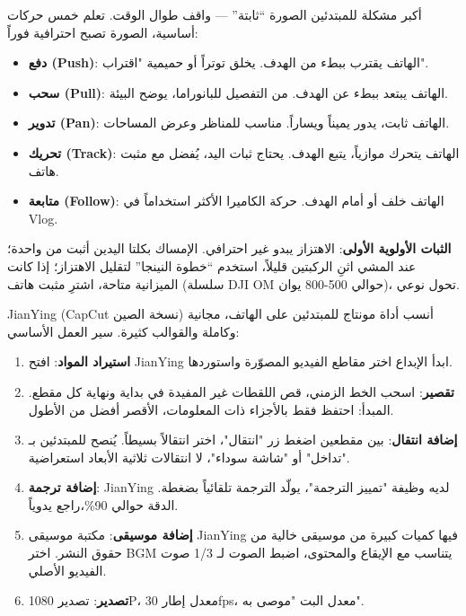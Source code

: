 أكبر مشكلة للمبتدئين الصورة “ثابتة” — واقف طوال الوقت. تعلم خمس حركات أساسية، الصورة تصبح احترافية فوراً:

\begin{itemize}
  \item \textbf{دفع (Push)}: الهاتف يقترب ببطء من الهدف. يخلق توتراً أو حميمية "اقتراب".
  \item \textbf{سحب (Pull)}: الهاتف يبتعد ببطء عن الهدف. من التفصيل للبانوراما، يوضح البيئة.
  \item \textbf{تدوير (Pan)}: الهاتف ثابت، يدور يميناً ويساراً. مناسب للمناظر وعرض المساحات.
  \item \textbf{تحريك (Track)}: الهاتف يتحرك موازياً، يتبع الهدف. يحتاج ثبات اليد، يُفضل مع مثبت هاتف.
  \item \textbf{متابعة (Follow)}: الهاتف خلف أو أمام الهدف. حركة الكاميرا الأكثر استخداماً في Vlog.
\end{itemize}

\textbf{الثبات الأولوية الأولى}: الاهتزاز يبدو غير احترافي. الإمساك بكلتا اليدين أثبت من واحدة؛ عند المشي اثنِ الركبتين قليلاً، استخدم “خطوة النينجا” لتقليل الاهتزاز؛ إذا كانت الميزانية متاحة، اشترِ مثبت هاتف (سلسلة DJI OM حوالي 500-800 يوان)، تحول نوعي.


JianYing (CapCut نسخة الصين) أنسب أداة مونتاج للمبتدئين على الهاتف، مجانية وكاملة والقوالب كثيرة. سير العمل الأساسي:

\begin{enumerate}
  \item \textbf{استيراد المواد}: افتح JianYing ابدأ الإبداع اختر مقاطع الفيديو المصوّرة واستوردها.
  \item \textbf{تقصير}: اسحب الخط الزمني، قص اللقطات غير المفيدة في بداية ونهاية كل مقطع. المبدأ: احتفظ فقط بالأجزاء ذات المعلومات، الأقصر أفضل من الأطول.
  \item \textbf{إضافة انتقال}: بين مقطعين اضغط زر "انتقال"، اختر انتقالاً بسيطاً. يُنصح للمبتدئين بـ "تداخل" أو "شاشة سوداء"، لا انتقالات ثلاثية الأبعاد استعراضية.
  \item \textbf{إضافة ترجمة}: JianYing لديه وظيفة "تمييز الترجمة"، يولّد الترجمة تلقائياً بضغطة. الدقة حوالي 90\%،راجع يدوياً.
  \item \textbf{إضافة موسيقى}: مكتبة موسيقى JianYing فيها كميات كبيرة من موسيقى خالية من حقوق النشر. اختر BGM يتناسب مع الإيقاع والمحتوى، اضبط الصوت لـ 1/3 صوت الفيديو الأصلي.
  \item \textbf{تصدير}: تصدير 1080P، معدل إطار 30fps، معدل البت "موصى به".
\end{enumerate}

